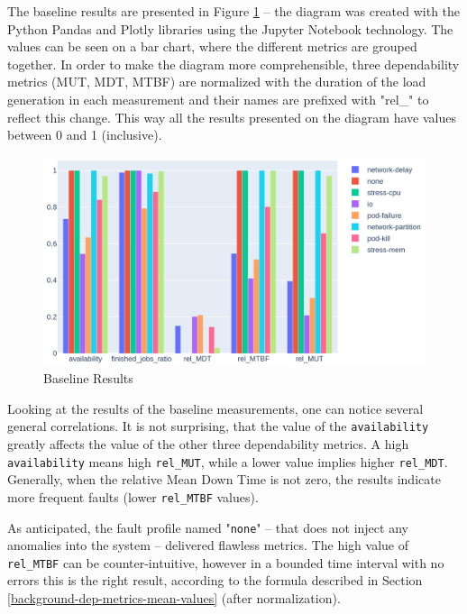 The baseline results are presented in Figure \ref{fig:baseline_results} -- the diagram was created with the Python Pandas \cite{Pandas} and Plotly \cite{Plotly} libraries using the Jupyter Notebook \cite{JupyterNotebook} technology. The values can be seen on a bar chart, where the different metrics are grouped together. In order to make the diagram more comprehensible, three dependability metrics (MUT, MDT, MTBF) are normalized with the duration of the load generation in each measurement and their names are prefixed with "rel\_" to reflect this change. This way all the results presented on the diagram have values between 0 and 1 (inclusive).

\begin{figure}[h]
	\centering
	\includegraphics[width=150mm, keepaspectratio]{figures/baseline_grouped_barchart.png}
	\caption{Baseline Results}
	\label{fig:baseline_results}
\end{figure}

Looking at the results of the baseline measurements, one can notice several general correlations. It is not surprising, that the value of the \texttt{availability} greatly affects the value of the other three dependability metrics. A high \texttt{availability} means high \texttt{rel\_MUT}, while a lower value implies higher \texttt{rel\_MDT}. Generally, when the relative Mean Down Time is not zero, the results indicate more frequent faults (lower \texttt{rel\_MTBF} values).

As anticipated, the fault profile named "\texttt{none}" -- that does not inject any anomalies into the system -- delivered flawless metrics. The high value of \texttt{rel\_MTBF} can be counter-intuitive, however in a bounded time interval with no errors this is the right result, according to the formula described in Section \ref{background-dep-metrics-mean-values} (after normalization).

